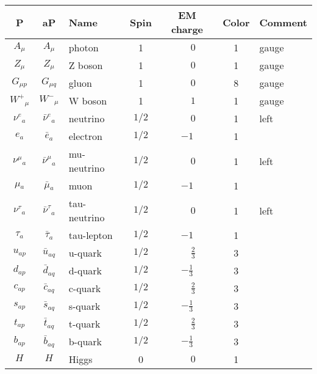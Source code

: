 \textwidth 17cm
\textheight 25cm
\hoffset -3cm
\voffset -1cm
\pagestyle{empty}

\begin{center}

\begin{tabular}{|cc|l|c|c|c|l|} \hline
P & aP & Name & Spin  & EM charge & Color & Comment \\ \hline
$A_{\mu }$&$A_{\mu }$&photon        &1           & $\phantom{-}0$ &1    &gauge\\
$Z_{\mu }$&$Z_{\mu }$&Z boson       &1           & $\phantom{-}0$ &1    &gauge\\
$G_{\mu p}$&$G_{\mu q}$&gluon         &1           & $\phantom{-}0$ &8    &gauge\\
$W^+{}_{\mu }$&$W^-{}_{\mu }$&W boson       &1           &$\phantom{-}1$ &1    &gauge\\
$\nu^e{}_{a}$&$\bar{\nu}^e{}_{a}$&neutrino      &$1/2$       & $\phantom{-}0$ &1    &left\\
$e{}_{a}$ &$\bar{e}{}_{a}$&electron      &$1/2$       &$-1$ &1    &   \\
$\nu^\mu{}_{a}$&$\bar{\nu}^\mu{}_{a}$&mu-neutrino   &$1/2$       & $\phantom{-}0$ &1    &left\\
$\mu{}_{a}$&$\bar{\mu}{}_{a}$&muon          &$1/2$       &$-1$ &1    &   \\
$\nu^\tau{}_{a}$&$\bar{\nu}^\tau{}_{a}$&tau-neutrino  &$1/2$       & $\phantom{-}0$ &1    &left\\
$\tau{}_{a}$&$\bar{\tau}{}_{a}$&tau-lepton    &$1/2$       &$-1$ &1    &   \\
$u{}_{ap}$&$\bar{u}{}_{aq}$&u-quark       &$1/2$       &$\phantom{-}\frac{2}{3}$ &3    &   \\
$d{}_{ap}$&$\bar{d}{}_{aq}$&d-quark       &$1/2$       &$-\frac{1}{3}$ &3    &   \\
$c{}_{ap}$&$\bar{c}{}_{aq}$&c-quark       &$1/2$       &$\phantom{-}\frac{2}{3}$ &3    &   \\
$s{}_{ap}$&$\bar{s}{}_{aq}$&s-quark       &$1/2$       &$-\frac{1}{3}$ &3    &   \\
$t{}_{ap}$&$\bar{t}{}_{aq}$&t-quark       &$1/2$       &$\phantom{-}\frac{2}{3}$ &3    &   \\
$b{}_{ap}$&$\bar{b}{}_{aq}$&b-quark       &$1/2$       &$-\frac{1}{3}$ &3    &   \\
$H_{}$    &$H_{}$    &Higgs         &0           & $\phantom{-}0$ &1    &   \\ \hline
\end{tabular}


\end{center}

